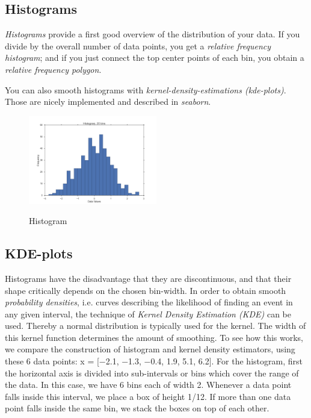 \subsection{Histograms}


\emph{Histograms} provide a first good overview of the distribution of your data.
If you divide by the overall number of data points, you get a \emph{relative frequency
histogram}; and if you just connect the top center points of each bin, you obtain a
\emph{relative frequency polygon}.

You can also smooth histograms with \emph{kernel-density-estimations (kde-plots)}. Those are nicely implemented and described in \emph{seaborn}.

\begin{figure}[ht]
  \centering
  \includegraphics[width=0.5\textwidth]{../Images/Histogram.png}\\
  \caption{Histogram}
\end{figure}

\subsection{KDE-plots}

Histograms have the disadvantage that they are discontinuous, and that their shape critically depends on the chosen bin-width. In order to obtain smooth \emph{probability densities}, i.e. curves describing the likelihood of finding an event in any given interval, the technique of \emph{Kernel Density Estimation (KDE)} can be used. Thereby a normal distribution is typically used for the kernel. The width of this kernel function determines the amount of smoothing. To see how this works, we compare the construction of histogram and kernel density estimators, using these 6 data points: x = [−2.1, −1.3, −0.4, 1.9, 5.1, 6.2]. For the histogram, first the horizontal axis is divided into sub-intervals or bins which cover the range of the data. In this case, we have 6 bins each of width 2. Whenever a data point falls inside this interval, we place a box of height 1/12. If more than one data point falls inside the same bin, we stack the boxes on top of each other.

